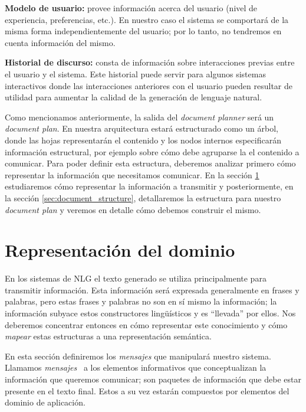 \bigskip
\noindent
\textbf{Modelo de usuario:} provee información acerca del usuario (nivel de experiencia, preferencias, etc.). En nuestro caso el sistema se comportará de la misma forma independientemente del usuario; por lo tanto, no tendremos en cuenta información del mismo.

\bigskip
\noindent
\textbf{Historial de discurso:} consta de información sobre interacciones previas entre el usuario y el sistema. Este historial puede servir para algunos sistemas interactivos donde las interacciones anteriores con el usuario pueden resultar de utilidad para aumentar la calidad de la generación de lenguaje natural.

\bigskip
Como mencionamos anteriormente, la salida del \textit{document planner} será un \textit{document plan}. En nuestra arquitectura estará estructurado como un árbol, donde las hojas representarán el contenido y los nodos internos especificarán información estructural, por ejemplo sobre cómo debe agruparse la el contenido a comunicar. Para poder definir esta estructura, deberemos analizar primero cómo representar la información que necesitamos comunicar. En la sección \ref{sec:representacion_dominio} estudiaremos cómo representar la información a transmitir y posteriormente, en la sección \ref{sec:document_structure}, detallaremos la estructura para nuestro \emph{document plan} y veremos en detalle cómo debemos construir el mismo.

\section{Representación del dominio}
\label{sec:representacion_dominio}

En los sistemas de NLG el texto generado se utiliza principalmente para transmitir información. Esta información será expresada generalmente en frases y palabras, pero estas frases y palabras no son en sí mismo la información; la información subyace estos constructores lingüísticos y es ``llevada'' por ellos. Nos deberemos concentrar entonces en cómo representar este conocimiento y cómo \textit{mapear} estas estructuras a una representación semántica. 

En esta sección definiremos los \emph{mensajes} que manipulará nuestro sistema. Llamamos \emph{mensajes}~\cite{reiter_dale} a los elementos informativos que conceptualizan la información que queremos comunicar; son paquetes de información que debe estar presente en el texto final. Estos a su vez estarán compuestos por elementos del dominio de aplicación.


